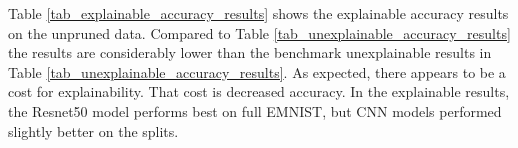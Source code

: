 \begin{table}[H]
    \renewcommand{\arraystretch}{1.3}
    \caption{Benchmark unexplainable accuracy results on the full and various splits of the balanced EMNIST data sets with differing ML models.}
    \begin{center}
    \end{center}
    \label{tab_unexplainable_accuracy_results}
\end{table}

Table \ref{tab_explainable_accuracy_results} shows the explainable accuracy
results on the unpruned data. Compared to Table
\ref{tab_unexplainable_accuracy_results} the results are considerably lower than
the benchmark unexplainable results in Table
\ref{tab_unexplainable_accuracy_results}.  As expected, there appears to be a
cost for explainability.  That cost is decreased accuracy. In the explainable
results, the Resnet50 model performs best on full EMNIST, but CNN models
performed slightly better on the splits.


